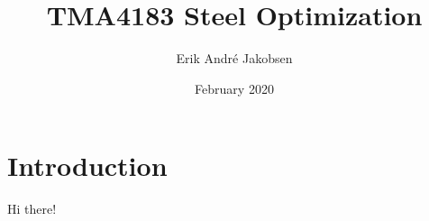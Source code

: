\documentclass{article}
\title{TMA4183 Steel Optimization}
\author{Erik André Jakobsen}
\date{February 2020}
\begin{document}
\maketitle

\section{Introduction}
Hi there!
\end{document}
